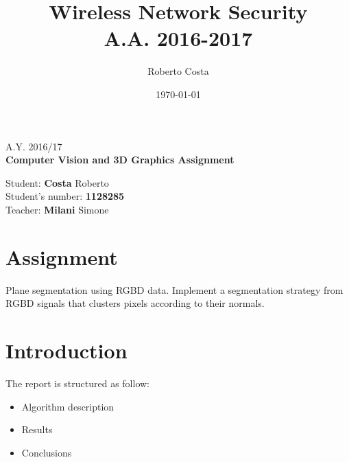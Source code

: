 \documentclass[11pt]{article}
\title{Wireless Network Security \\ A.A. 2016-2017}
\author{Roberto Costa} %
\date{\today}
\begin{document}
\begin{center}
	\Large A.Y. 2016/17\\
	\huge \textbf{Computer Vision and 3D Graphics Assignment}\\[3mm]
	\begin{framed}
		\Large Student: \textbf{Costa} Roberto\\[2mm]
		\normalsize Student's number: \textbf{1128285}\\
		\Large Teacher: \textbf{Milani} Simone\\[2mm]
	\end{framed}
\end{center}
\section{Assignment}
Plane segmentation using RGBD data. Implement a segmentation strategy from RGBD signals that clusters pixels according to their normals.
\section{Introduction}
The report is structured as follow: \begin{itemize}
\item Algorithm description
\item Results
\item Conclusions
\end{itemize}
\end{document}
